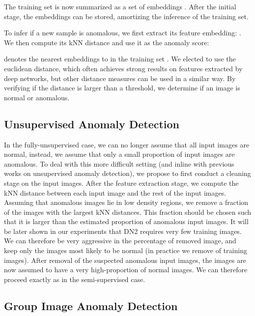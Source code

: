 \documentclass{article}
\begin{document}
The training set is now summarized as a set of embeddings . After the initial stage, the embeddings can be stored, amortizing the inference of the training set.

To infer if a new sample  is anomalous, we first extract its feature embedding: . We then compute its kNN distance and use it as the anomaly score:

 denotes the  nearest embeddings to  in the training set  . We elected to use the euclidean distance, which often achieves strong results on features extracted by deep networks, but other distance measures can be used in a similar way. By verifying if the distance  is larger than a threshold, we determine if an image  is normal or anomalous. 

\subsection{Unsupervised Anomaly Detection}
\label{subsec:unsupervised}

In the fully-unsupervised case, we can no longer assume that all input images are normal, instead, we assume that only a small proportion of input images are anomalous. To deal with this more difficult setting (and inline with previous works on unsupervised anomaly detection), we propose to first conduct a cleaning
stage on the input images. After the feature extraction stage, we compute the kNN distance between each input image and the rest of the input images. Assuming that anomalous images lie in low density regions, we remove a fraction of the images with the largest kNN distances. This fraction should be chosen such that it is larger than the estimated proportion of anomalous input images. It will be later shown in our experiments that DN2 requires very few training images. We can therefore be very aggressive in the percentage of removed image, and keep only the images most likely to be normal (in practice we remove  of training images). After removal of the suspected anomalous input images, the images are now assumed to have a very high-proportion of normal images. We can therefore proceed exactly as in the semi-supervised case.

\subsection{Group Image Anomaly Detection}
\label{subsec:group}
\end{document}
